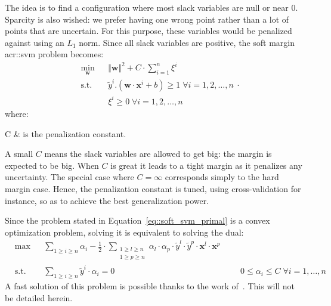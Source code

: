                 The idea is to find a configuration where most slack variables are null or near $0$.
                Sparcity is also wished: we prefer having one wrong point rather than a lot of points that are uncertain.
                For this purpose, these variables would be penalized against using an $L_1$ norm.
                Since all slack variables are positive, the soft margin \gls{acr::svm} problem becomes:
                \begin{equation}
                    \label{eq::soft_svm_primal}
                    \begin{aligned}
                        & \min_{\bm{w}}
                        & & {\Vert \bm{w} \Vert}^2 + C \cdot \sum_{i=1}^n \xi^i \\
                        & \text{s.t.} & & \tilde{y}^i.(\bm{w}\cdot\bm{x}^i + b) \geq 1 \; \forall i = 1, 2, \dots, n\\
                        & & & \xi^i \geq 0 \; \forall i = 1, 2, \dots, n
                    \end{aligned}.
                \end{equation}
                where:
                \begin{conditions}
                    C & is the penalization constant.\\
                \end{conditions}

                A small $C$ means the slack variables are allowed to get big: the margin is expected to be big.
                When $C$ is great it leads to a tight margin as it penalizes any uncertainty.
                The special case where $C=\infty$ corresponds simply to the hard margin case.
                Hence, the penalization constant is tuned, using cross-validation for instance, so as to achieve the best generalization power.

                Since the problem stated in Equation~\ref{eq::soft_svm_primal} is a convex optimization problem, solving it is equivalent to solving the dual:
                \begin{equation}
                    \label{eq::soft_svm_dual}
                    \begin{aligned}
                        & \max
                        & & \sum_{1\geq i \geq n} \alpha_i - \frac{1}{2}\cdot\sum_{\substack{1\geq l \geq n\\1\geq p \geq n}}\alpha_l\cdot\alpha_p\cdot\tilde{y}^l\cdot\tilde{y}^p\cdot\bm{x}^l\cdot\bm{x}^p\\
                        &\text{s.t.} & & \sum_{1\geq i \geq n}\tilde{y}^i\cdot\alpha_i=0
                        & & & 0 \leq \alpha_i \leq C \;\forall i=1,\dots,n
                        \end{aligned}
                \end{equation}
                A fast solution of this problem is possible thanks to the work of~\textcite{platt1998sequential}.
                This will not be detailed herein. 

